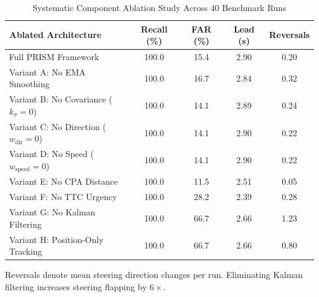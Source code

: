 \begin{table}[t]
\caption{Systematic Component Ablation Study Across 40 Benchmark Runs}
\label{tab:ablations}
\centering
\footnotesize
\setlength{\tabcolsep}{2.5pt}
\begin{tabularx}{\columnwidth}{Xcccc}
\toprule
\textbf{Ablated Architecture} & \textbf{Recall (\%)} & \textbf{FAR (\%)} & \textbf{Lead (s)} & \textbf{Reversals} \\
\midrule
Full PRISM Framework & 100.0 & 15.4 & 2.90 & 0.20 \\
Variant A: No EMA Smoothing & 100.0 & 16.7 & 2.84 & 0.32 \\
Variant B: No Covariance ($k_\sigma=0$) & 100.0 & 14.1 & 2.89 & 0.24 \\
Variant C: No Direction ($w_{\text{dir}}=0$) & 100.0 & 14.1 & 2.90 & 0.22 \\
Variant D: No Speed ($w_{\text{speed}}=0$) & 100.0 & 14.1 & 2.90 & 0.22 \\
Variant E: No CPA Distance & 100.0 & 11.5 & 2.51 & 0.05 \\
Variant F: No TTC Urgency & 100.0 & 28.2 & 2.39 & 0.28 \\
Variant G: No Kalman Filtering & 100.0 & 66.7 & 2.66 & 1.23 \\
Variant H: Position-Only Tracking & 100.0 & 66.7 & 2.66 & 0.80 \\
\bottomrule
\end{tabularx}
\vspace{0.04cm}
\par{\raggedright \scriptsize Reversals denote mean steering direction changes per run. Eliminating Kalman filtering increases steering flapping by $6\times$.\par}
\end{table}
